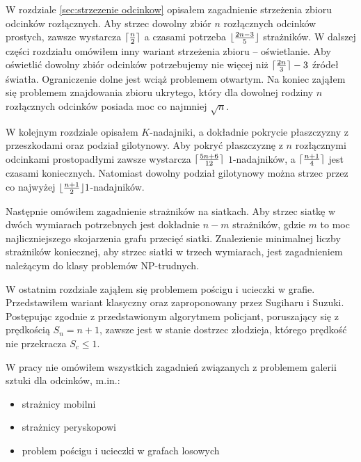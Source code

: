 \documentclass[brudnopis]{xmgr}
\DeclarePairedDelimiter\ceil{\lceil}{\rceil}
\DeclarePairedDelimiter\floor{\lfloor}{\rfloor}
\theoremstyle{definition}
\begin{document}
W rozdziale \ref{sec:strzezenie odcinkow} opisałem zagadnienie strzeżenia zbioru odcinków rozłącznych.
Aby strzec dowolny zbiór $n$ rozłącznych odcinków prostych, zawsze wystarcza $\ceil{\frac{n}{2}}$ a czasami potrzeba $\floor{\frac{2n-3}{5}}$ strażników. W dalszej części rozdziału omówiłem inny wariant strzeżenia zbioru -- oświetlanie. Aby oświetlić dowolny zbiór odcinków potrzebujemy nie więcej niż $\ceil{\frac{2n}{3}} - 3$ źródeł światła. Ograniczenie dolne jest wciąż problemem otwartym. Na koniec zająłem  się problemem znajdowania zbioru ukrytego, który dla dowolnej rodziny $n$ rozłącznych odcinków posiada moc co najmniej $\sqrt{n}$.

W kolejnym rozdziale opisałem $K$-nadajniki, a dokładnie pokrycie płaszczyzny z przeszkodami oraz podział gilotynowy. Aby pokryć płaszczyznę z $n$ rozłącznymi odcinkami prostopadłymi zawsze wystarcza $\ceil{\frac{5n+6}{12}}$ $1$-nadajników, a $\ceil{\frac{n+1}{4}}$ jest czasami koniecznych. Natomiast dowolny podział gilotynowy można strzec przez co najwyżej $\floor{\frac{n+1}{2}} 1$-nadajników.

Następnie omówiłem zagadnienie strażników na siatkach. Aby strzec siatkę w dwóch wymiarach potrzebnych jest dokładnie $n - m$ strażników, gdzie $m$ to moc najliczniejszego skojarzenia grafu przecięć siatki. Znalezienie minimalnej liczby strażników koniecznej, aby strzec siatki w trzech wymiarach, jest zagadnieniem należącym do klasy problemów NP-trudnych.

W ostatnim rozdziale zająłem się problemem pościgu i ucieczki w grafie. Przedstawiłem wariant klasyczny oraz zaproponowany przez Sugiharu i Suzuki. Postępując zgodnie z przedstawionym algorytmem policjant, poruszający się z prędkością $S_n = n + 1$, zawsze jest w stanie dostrzec złodzieja, którego prędkość nie przekracza $S_c \leq 1$. 

W pracy nie omówiłem wszystkich zagadnień związanych z problemem galerii sztuki dla odcinków, m.in.:
\begin{itemize}
 \item strażnicy mobilni \cite{mobileguards}
 \item strażnicy peryskopowi \cite{periscope}
 \item problem pościgu i ucieczki w grafach losowych \cite{randompursuit}
\end{itemize}

\appendix
\end{document}
